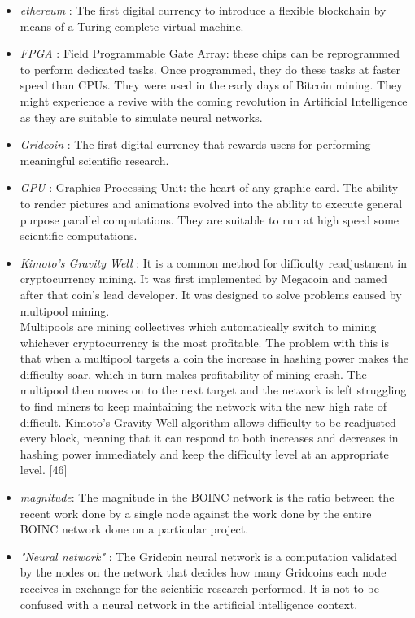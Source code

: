\begin{itemize}
  \item \textit{ethereum} : The first digital currency to introduce a flexible blockchain by means of a Turing complete virtual machine.
  \item \textit{FPGA} : Field Programmable Gate Array: these chips can be reprogrammed to perform dedicated tasks. Once programmed, they do these tasks at faster speed than CPUs. They were used in the early days of Bitcoin mining. They might experience a revive with the coming revolution in Artificial Intelligence as they are suitable to simulate neural networks.
  \item \textit{Gridcoin} : The first digital currency that rewards users for performing meaningful scientific research.
  \item \textit{GPU} : Graphics Processing Unit: the heart of any graphic card. The ability to render pictures and animations evolved into the ability to execute general purpose parallel computations. They are suitable to run at high speed some scientific computations.
  \item \textit{Kimoto's Gravity Well} : It is a common method for difficulty readjustment in cryptocurrency mining. 
  It was first implemented by Megacoin and named after that coin’s lead developer. It was designed to solve problems caused by multipool mining.\\
  Multipools are mining collectives which automatically switch to mining whichever cryptocurrency is the most profitable. The problem with this is that when a multipool targets a coin the increase in hashing power makes the difficulty soar, which in turn makes profitability of mining crash. The multipool then moves on to the next target and the network is left struggling to find miners to keep maintaining the network with the new high rate of difficult. Kimoto’s Gravity Well algorithm allows difficulty to be readjusted every block, meaning that it can respond to both increases and decreases in hashing power immediately and keep the difficulty level at an appropriate level. [46]
  \item \textit{magnitude}: The magnitude in the BOINC network is the ratio between the recent work done by a single node against the work done by the entire BOINC network done on a particular project.
  \item \textit{"Neural network"} : The Gridcoin neural network is a computation validated by the nodes on the network that decides how many Gridcoins each node receives in exchange for the scientific research performed. It is not to be confused with a neural network in the artificial intelligence context.

\end{itemize}
